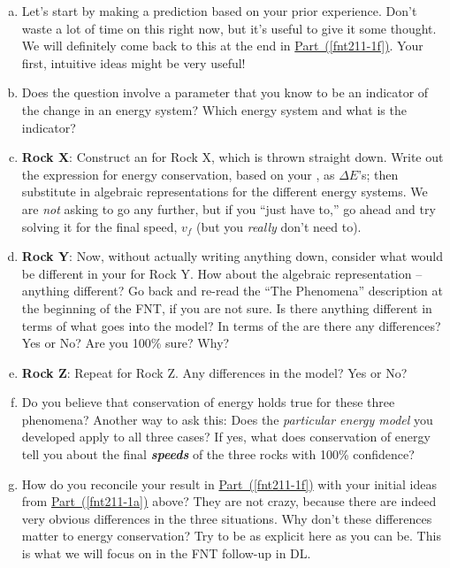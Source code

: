 \begin{enumerate}[(a)]
	\item Let's start by making a prediction based on your prior experience. Don't waste a lot of time on this right now, but it's useful to give it some thought. We will definitely come back to this at the end in \hyperref[fnt211-1f]{Part~(\ref*{fnt211-1f})}. Your first, intuitive ideas might be very useful!
	\label{fnt211-1a}
	
	\item Does the question involve a parameter that you know to be an indicator of the change in an energy system? Which energy system and what is the indicator?
	\label{fnt211-1b}
	
	\item \textbf{Rock X}: Construct an \EnergyDiagram{} for Rock X, which is thrown straight down. Write out the expression for energy conservation, based on your \EnergyDiagram{}, as $\Delta E$'s; then substitute in algebraic representations for the different energy systems. We are \emph{not} asking to go any further, but if you ``just have to,'' go ahead and try solving it for the final speed, $v_f$ (but you \emph{really} don't need to).
	\label{fnt211-1c}
	
	\item \textbf{Rock Y}: Now, without actually writing anything down, consider what would be different in your \EnergyDiagram{} for Rock Y. How about the algebraic representation -- anything different?  Go back and re-read the ``The Phenomena'' description at the beginning of the FNT, if you are not sure. Is there anything different in terms of what goes into the model? In terms of the \EnergyInteractionModel{} are there any differences?  Yes or No? Are you 100\% sure? Why?
	\label{fnt211-1d}
	
	\item \textbf{Rock Z}: Repeat for Rock Z. Any differences in the model?  Yes or No?
	\label{fnt211-1e}
	
	\item Do you believe that conservation of energy holds true for these three phenomena? Another way to ask this: Does the {\em particular energy model} you developed apply to all three cases?  If yes, what does conservation of energy tell you about the final \textbf{\em speeds} of the three rocks with 100\% confidence?
	\label{fnt211-1f}
	
	\item How do you reconcile your result in \hyperref[fnt211-1f]{Part~(\ref*{fnt211-1f})} with your initial ideas from \hyperref[fnt211-1a]{Part~(\ref*{fnt211-1a})} above?  They are not crazy, because there are indeed very obvious differences in the three situations. Why don't these differences matter to energy conservation?  Try to be as explicit here as you can be. This is what we will focus on in the FNT follow-up in DL.
	\label{fnt211-1g}
\end{enumerate}